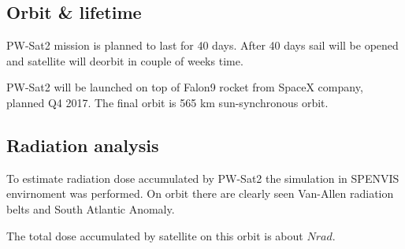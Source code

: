 \subsection{Orbit \& lifetime}
    PW-Sat2 mission is planned to last for 40 days. After 40 days sail will be opened and satellite will deorbit in couple of weeks time.

    PW-Sat2 will be launched on top of Falon9 rocket from SpaceX company, planned Q4 2017. The final orbit is 565 km sun-synchronous orbit.


\subsection{Radiation analysis}
    To estimate radiation dose accumulated by PW-Sat2 the simulation in SPENVIS envirnoment was performed. 
    On orbit there are clearly seen Van-Allen radiation belts and South Atlantic Anomaly. 

    The total dose accumulated by satellite on this orbit is about $N rad$.
